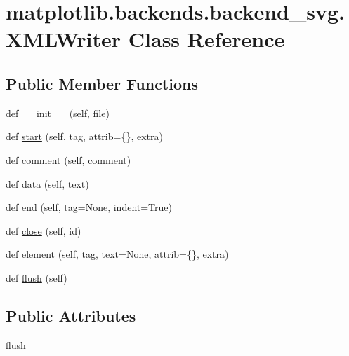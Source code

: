 \hypertarget{classmatplotlib_1_1backends_1_1backend__svg_1_1XMLWriter}{}\section{matplotlib.\+backends.\+backend\+\_\+svg.\+X\+M\+L\+Writer Class Reference}
\label{classmatplotlib_1_1backends_1_1backend__svg_1_1XMLWriter}
\subsection*{Public Member Functions}
\begin{DoxyCompactItemize}
\item 
def \hyperlink{classmatplotlib_1_1backends_1_1backend__svg_1_1XMLWriter_a4dcc110dc37296dbcf5a417a5bb83364}{\+\_\+\+\_\+init\+\_\+\+\_\+} (self, file)
\item 
def \hyperlink{classmatplotlib_1_1backends_1_1backend__svg_1_1XMLWriter_a98d6486ea40d99414ee9a46491890a5b}{start} (self, tag, attrib=\{\}, extra)
\item 
def \hyperlink{classmatplotlib_1_1backends_1_1backend__svg_1_1XMLWriter_a84f4a452f0e8080a7714a81b100a6aaf}{comment} (self, comment)
\item 
def \hyperlink{classmatplotlib_1_1backends_1_1backend__svg_1_1XMLWriter_a2e49d656afb2c9a67260e8ebabc6a0ae}{data} (self, text)
\item 
def \hyperlink{classmatplotlib_1_1backends_1_1backend__svg_1_1XMLWriter_ab4fe56b2d2188df02a791a7b59461624}{end} (self, tag=None, indent=True)
\item 
def \hyperlink{classmatplotlib_1_1backends_1_1backend__svg_1_1XMLWriter_a39eddb647a0d37c28cdb7bc3f8d24ff6}{close} (self, id)
\item 
def \hyperlink{classmatplotlib_1_1backends_1_1backend__svg_1_1XMLWriter_ace3f1df94b65dc0eb62298f59cc03c84}{element} (self, tag, text=None, attrib=\{\}, extra)
\item 
def \hyperlink{classmatplotlib_1_1backends_1_1backend__svg_1_1XMLWriter_a977cf00f61ccd9c974a20a925535d83a}{flush} (self)
\end{DoxyCompactItemize}
\subsection*{Public Attributes}
\begin{DoxyCompactItemize}
\item 
\hyperlink{classmatplotlib_1_1backends_1_1backend__svg_1_1XMLWriter_a4e4f558ce8e7474d28f6243cf6d39ef2}{flush}
\end{DoxyCompactItemize}


